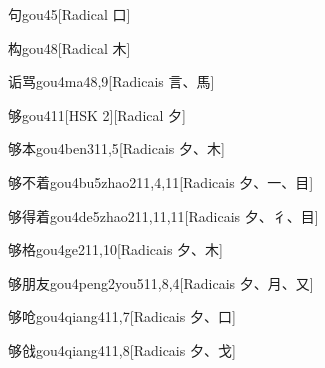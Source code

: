 \begin{entry}{句}{gou4}{5}[Radical ⼝]
\end{entry}

\begin{entry}{构}{gou4}{8}[Radical ⽊]
\end{entry}

\begin{entry}{诟骂}{gou4ma4}{8,9}[Radicais ⾔、⾺]
\end{entry}

\begin{entry}{够}{gou4}{11}[HSK 2][Radical ⼣]
\end{entry}

\begin{entry}{够本}{gou4ben3}{11,5}[Radicais ⼣、⽊]
\end{entry}

\begin{entry}{够不着}{gou4bu5zhao2}{11,4,11}[Radicais ⼣、⼀、⽬]
\end{entry}

\begin{entry}{够得着}{gou4de5zhao2}{11,11,11}[Radicais ⼣、⼻、⽬]
\end{entry}

\begin{entry}{够格}{gou4ge2}{11,10}[Radicais ⼣、⽊]
\end{entry}

\begin{entry}{够朋友}{gou4peng2you5}{11,8,4}[Radicais ⼣、⽉、⼜]
\end{entry}

\begin{entry}{够呛}{gou4qiang4}{11,7}[Radicais ⼣、⼝]
\end{entry}

\begin{entry}{够戗}{gou4qiang4}{11,8}[Radicais ⼣、⼽]
\end{entry}

